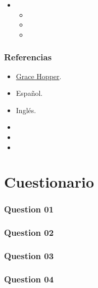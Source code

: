 \documentclass[a4paper,12pt]{mac_cv}
\begin{document}
\begin{itemize}
  \item \lipsum[8][5]
        \begin{itemize}
          \item \lipsum[8][6]
          \item \lipsum[8][7]
          \item \lipsum[8][8]
        \end{itemize}
\end{itemize}
\subsubsection*{Referencias}
\begin{itemize}
  \item \href{https://www.linkedin.com/in/}{Grace Hopper}.
\end{itemize}


\CVIdiomas
\begin{itemize}
  \item Español.
  \item Inglés.
\end{itemize}

\CVMiscelanea
\begin{itemize}
  \item \lipsum[8][9]
  \item \lipsum[8][10]
  \item \lipsum[8][11]
\end{itemize}

\pagebreak

\thispagestyle{body}

\section*{Cuestionario}

\subsubsection*{Question 01}
\lipsum[9-11]

\subsubsection*{Question 02}
\lipsum[11-12]

\subsubsection*{Question 03}
\lipsum[12-14]

\subsubsection*{Question 04}
\lipsum[13-15]
\end{document}
